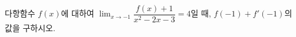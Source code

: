 다항함수 $f(x)$에 대하여 $\displaystyle\lim_{x\to -1}\dfrac{f(x)+1}{x^2-2x-3}=4$일 때, $f(-1)+f'(-1)$의 값을 구하시오.
